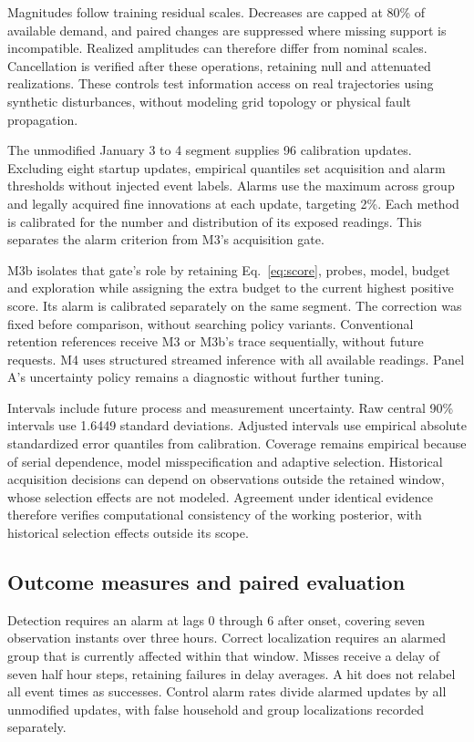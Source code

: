 \documentclass[conference]{IEEEtran}
\begin{document}
Magnitudes follow training residual scales. Decreases are capped at 80\% of available demand, and paired changes are suppressed where missing support is incompatible. Realized amplitudes can therefore differ from nominal scales. Cancellation is verified after these operations, retaining null and attenuated realizations. These controls test information access on real trajectories using synthetic disturbances, without modeling grid topology or physical fault propagation.

The unmodified January 3 to 4 segment supplies 96 calibration updates. Excluding eight startup updates, empirical quantiles set acquisition and alarm thresholds without injected event labels. Alarms use the maximum across group and legally acquired fine innovations at each update, targeting 2\%. Each method is calibrated for the number and distribution of its exposed readings. This separates the alarm criterion from M3's acquisition gate.

M3b isolates that gate's role by retaining Eq.~\eqref{eq:score}, probes, model, budget and exploration while assigning the extra budget to the current highest positive score. Its alarm is calibrated separately on the same segment. The correction was fixed before comparison, without searching policy variants. Conventional retention references receive M3 or M3b's trace sequentially, without future requests. M4 uses structured streamed inference with all available readings. Panel A's uncertainty policy remains a diagnostic without further tuning.

Intervals include future process and measurement uncertainty. Raw central 90\% intervals use 1.6449 standard deviations. Adjusted intervals use empirical absolute standardized error quantiles from calibration. Coverage remains empirical because of serial dependence, model misspecification and adaptive selection. Historical acquisition decisions can depend on observations outside the retained window, whose selection effects are not modeled. Agreement under identical evidence therefore verifies computational consistency of the working posterior, with historical selection effects outside its scope.

\subsection{Outcome measures and paired evaluation}
Detection requires an alarm at lags 0 through 6 after onset, covering seven observation instants over three hours. Correct localization requires an alarmed group that is currently affected within that window. Misses receive a delay of seven half hour steps, retaining failures in delay averages. A hit does not relabel all event times as successes. Control alarm rates divide alarmed updates by all unmodified updates, with false household and group localizations recorded separately.
\end{document}
